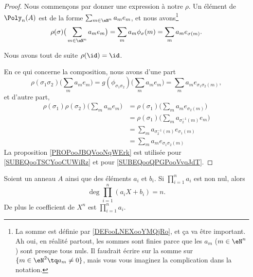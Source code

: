 \begin{proof}
	Nous commençons par donner une expression à notre \( \rho\). Un élément de \( \Poly_n(A)\) est de la forme \( \sum_{m\in \eN^n}a_me_m\), et nous avons\footnote{La somme est définie par \ref{DEFooLNEXooYMQjRo}, et ça va être important. Ah oui, en réalité partout, les sommes sont finies parce que les \( a_m\) (\( m\in \eN^n\)) sont presque tous nuls. Il faudrait écrire sur la somme sur \(\{ m\in \eN^2\tq a_m\neq 0 \}\), mais vous vous imaginez la complication dans la notation.}
	\begin{equation}
		\rho(\sigma)\big( \sum_{m\in \eN^n}a_me_m \big)=\sum_ma_m\phi_{\sigma}(m)=\sum_ma_me_{\sigma(m)}.
	\end{equation}

	Nous avons tout de suite \( \rho(\id)=\id\).

	En ce qui concerne la composition, nous avons d'une part
	\begin{equation}
		\rho(\sigma_1\sigma_2)\big( \sum_ma_me_m \big)=g(\phi_{\sigma_1\sigma_2})\big( \sum_ma_me_m \big)=\sum_ma_me_{\sigma_1\sigma_2(m)},
	\end{equation}
	et d'autre part,
	\begin{subequations}
		\begin{align}
			\rho(\sigma_1)\rho(\sigma_2)\big( \sum_ma_me_m \big) & =\rho(\sigma_1)\big( \sum_ma_me_{\sigma_2(m)} \big)                                    \\
			                                                     & =\rho(\sigma_1)\big( \sum_ma_{\sigma_2^{-1}(m)}e_m \big)   \label{SUBEQooTSCYooCUWiRz} \\
			                                                     & =\sum_ma_{\sigma_2^{-1}(m)}e_{\sigma_1(m)}                                             \\
			                                                     & =\sum_ma_me_{\sigma_1\sigma_2(m)}      \label{SUBEQooQPGPooVvqJdT}
		\end{align}
	\end{subequations}
	La proposition \ref{PROPooJBQVooNqWErk} est utilisée pour \eqref{SUBEQooTSCYooCUWiRz} et pour \eqref{SUBEQooQPGPooVvqJdT}.
\end{proof}


\begin{proposition}	\label{PROPooUIZOooCqQzJh}
	Soient un anneau \( A\) ainsi que des éléments \( a_i\) et \( b_i\). Si \( \prod_{i=1}^na_i\) est non nul, alors
	\begin{equation}
		\deg \prod_{i=1}^n(a_iX+b_i)=n.
	\end{equation}
	De plus le coefficient de \( X^n\) est \( \prod_{i=1}^na_i\).
\end{proposition}


